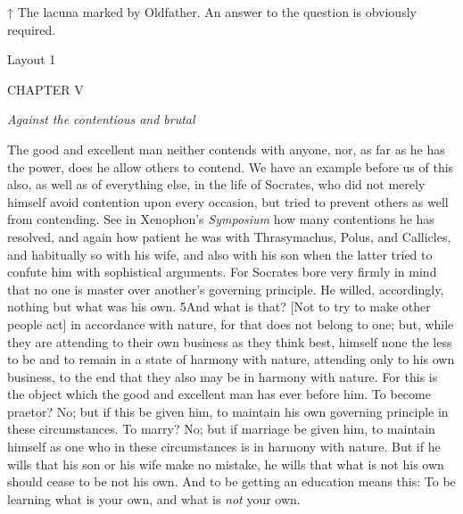 
↑ The lacuna marked by Oldfather. An answer to the question is obviously required.


Layout 1

CHAPTER V

\emph{Against the contentious and brutal}

The good and excellent man neither contends with anyone, nor, as far as he has the power, does he allow others to contend. We have an example before us of this also, as well as of everything else, in the life of Socrates, who did not merely himself avoid contention upon every occasion, but tried to prevent others as well from contending. See in Xenophon's \emph{Symposium} how many contentions he has resolved, and again how patient he was with Thrasymachus, Polus, and Callicles, and habitually so with his wife, and also with his son when the latter tried to confute him with sophistical arguments. For Socrates bore very firmly in mind that no one is master over another's governing principle. He willed, accordingly, nothing but what was his own. 5And what is that? [Not to try to make other people act] in accordance with nature, for that does not belong to one; but, while they are attending to their own business as they think best, himself none the less to be and to remain in a state of harmony with nature, attending only to his own business, to the end that they also may be in harmony with nature. For this is the object which the good and excellent man has ever before him. To become praetor? No; but if this be given him, to maintain his own governing principle in these circumstances. To marry? No; but if marriage be given him, to maintain himself as one who in these circumstances is in harmony with nature. But if he wills that his son or his wife make no mistake, he wills that what is not his own should cease to be not his own. And to be getting an education means this: To be learning what is your own, and what is \emph{not} your own.

